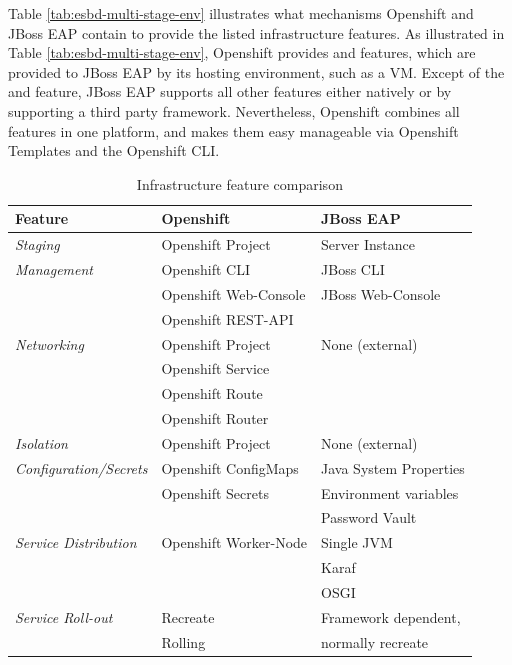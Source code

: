 Table \vref{tab:esbd-multi-stage-env} illustrates what mechanisms Openshift and JBoss EAP contain to provide the listed infrastructure features. As illustrated in Table \vref{tab:esbd-multi-stage-env}, Openshift provides  and  features, which are provided to JBoss EAP by its hosting environment, such as a VM. Except of the  and  feature, JBoss EAP supports all other features either natively or by supporting a third party framework. Nevertheless, Openshift combines all features in one platform, and makes them easy manageable via Openshift Templates and the Openshift CLI.

{\renewcommand{\arraystretch}{1.2}%
\begin{table}[h]
	\begin{tabularx}{\textwidth}{ X|X|X }	
	  \textbf{Feature}              & \textbf{Openshift}      & \textbf{JBoss EAP} \\  \hline
	  \textit{Staging}                  & Openshift Project       & Server Instance \\  \hline
	  \textit{Management}               & Openshift CLI           & JBoss CLI \\
	                                    & Openshift Web-Console   & JBoss Web-Console \\
	                                    & Openshift REST-API      & \\  \hline
	  \textit{Networking}               & Openshift Project       & None (external) \\
	                                    & Openshift Service       & \\  
	                                    & Openshift Route         & \\  \hline
	                                    & Openshift Router        & \\  \hline
	  \textit{Isolation}                & Openshift Project       & None (external) \\  \hline
	  \textit{Configuration/Secrets}    & Openshift ConfigMaps    & Java System Properties  \\
	                                    & Openshift Secrets       & Environment variables \\
	                                                             && Password Vault \\  \hline
	  \textit{Service Distribution}     & Openshift Worker-Node   & Single JVM \\ 
			                                                     && Karaf \\  
			                                                     && OSGI \\  \hline
	  \textit{Service Roll-out}         & Recreate                & Framework dependent, \\ 
			                            & Rolling                 & normally recreate \\
	\end{tabularx}
	\caption{Infrastructure feature comparison}
	\label{tab:esbd-multi-stage-env}
\end{table}}

